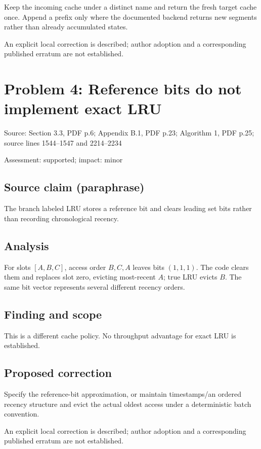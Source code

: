 \documentclass[11pt]{article}
\begin{document}
Keep the incoming cache under a distinct name and return the fresh target cache once. Append a prefix only where the documented backend returns new segments rather than already accumulated states.

An explicit local correction is described; author adoption and a corresponding published erratum are not established.

\section*{Problem 4: Reference bits do not implement exact LRU}

Source: Section 3.3, PDF p.6; Appendix B.1, PDF p.23; Algorithm 1, PDF p.25; source lines 1544–1547 and 2214–2234

Assessment: supported; impact: minor

\subsection*{Source claim (paraphrase)}

The branch labeled LRU stores a reference bit and clears leading set bits rather than recording chronological recency.

\subsection*{Analysis}

For slots \([A,B,C]\), access order \(B,C,A\) leaves bits \((1,1,1)\). The code clears them and replaces slot zero, evicting most-recent \(A\); true LRU evicts \(B\). The same bit vector represents several different recency orders.

\subsection*{Finding and scope}

This is a different cache policy. No throughput advantage for exact LRU is established.

\subsection*{Proposed correction}

Specify the reference-bit approximation, or maintain timestamps/an ordered recency structure and evict the actual oldest access under a deterministic batch convention.

An explicit local correction is described; author adoption and a corresponding published erratum are not established.
\end{document}
